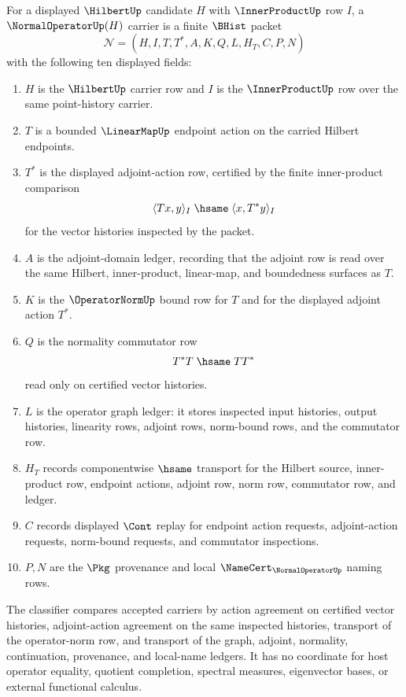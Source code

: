 \begin{definition}
\label{def:normal-operator-carrier}
For a displayed $\HilbertUp$ candidate $H$ with $\InnerProductUp$ row $I$, a $\NormalOperatorUp(H)$ carrier is a finite $\BHist$ packet
$$
\mathcal{N}=(H,I,T,T^\ast,A,K,Q,L,H_T,C,P,N)
$$
with the following ten displayed fields:
\begin{enumerate}
\item $H$ is the $\HilbertUp$ carrier row and $I$ is the $\InnerProductUp$ row over the same point-history carrier.
\item $T$ is a bounded $\LinearMapUp$ endpoint action on the carried Hilbert endpoints.
\item $T^\ast$ is the displayed adjoint-action row, certified by the finite inner-product comparison
$$
\langle T x,y\rangle_I \;\hsame\; \langle x,T^\ast y\rangle_I
$$
for the vector histories inspected by the packet.
\item $A$ is the adjoint-domain ledger, recording that the adjoint row is read over the same Hilbert, inner-product, linear-map, and boundedness surfaces as $T$.
\item $K$ is the $\OperatorNormUp$ bound row for $T$ and for the displayed adjoint action $T^\ast$.
\item $Q$ is the normality commutator row
$$
T^\ast T \;\hsame\; T T^\ast
$$
read only on certified vector histories.
\item $L$ is the operator graph ledger: it stores inspected input histories, output histories, linearity rows, adjoint rows, norm-bound rows, and the commutator row.
\item $H_T$ records componentwise $\hsame$ transport for the Hilbert source, inner-product row, endpoint actions, adjoint row, norm row, commutator row, and ledger.
\item $C$ records displayed $\Cont$ replay for endpoint action requests, adjoint-action requests, norm-bound requests, and commutator inspections.
\item $P,N$ are the $\Pkg$ provenance and local $\NameCert_{\NormalOperatorUp}$ naming rows.
\end{enumerate}
The classifier compares accepted carriers by action agreement on certified vector histories, adjoint-action agreement on the same inspected histories, transport of the operator-norm row, and transport of the graph, adjoint, normality, continuation, provenance, and local-name ledgers. It has no coordinate for host operator equality, quotient completion, spectral measures, eigenvector bases, or external functional calculus.
\end{definition}

